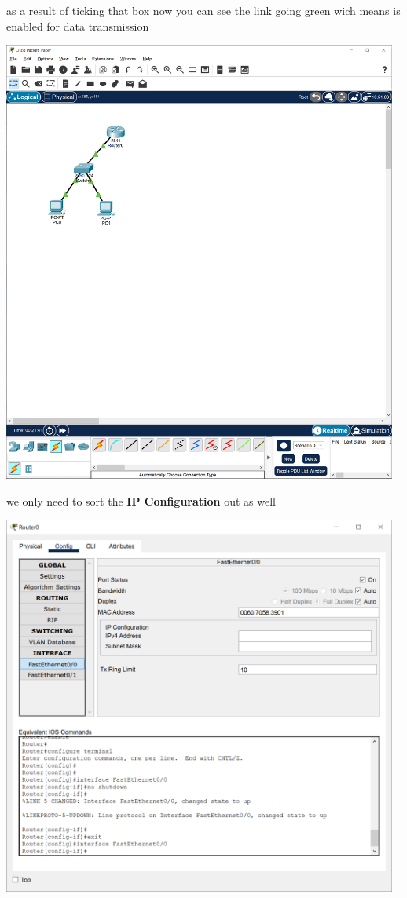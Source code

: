 \documentclass[a4paper,12pt]{article}
\begin{document}
\noindent as a result of ticking that box now you can see the link going green wich means is enabled for data transmission \newline

\noindent \includegraphics[width=13cm]{./step-by-step/15.PNG}
\clearpage


\noindent we only need to sort the \textbf{IP Configuration} out as well \newline

\noindent \includegraphics[width=13cm]{./step-by-step/16.PNG}
\clearpage
\end{document}
